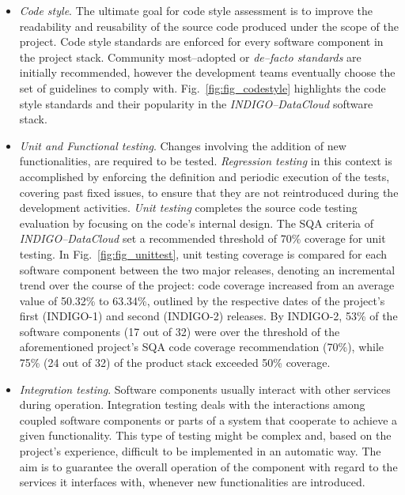 \documentclass[journal]{IEEEtran}
\begin{document}
\begin{itemize}
\item \textit{Code style}.
The ultimate goal for code style assessment is to improve the readability and reusability of the source code produced under the scope of the
project. Code style standards are enforced for every software component in the project stack. Community
most--adopted or \textit{de--facto standards} are initially recommended, however the development teams eventually
choose the set of guidelines to comply with. Fig.~\ref{fig:fig_codestyle} highlights the code style standards and
their popularity
in the {\sl INDIGO--DataCloud} software stack.

\item \textit{Unit and Functional testing}.
Changes involving the addition of new functionalities, are required to be tested. \textit{Regression
testing} in this context is accomplished by enforcing the definition and periodic execution
of the tests, covering past fixed issues, to ensure that they are not reintroduced during the development
activities. \textit{Unit testing} completes the source code testing evaluation by focusing on the code's 
internal design. The SQA criteria of {\sl INDIGO--DataCloud} set a recommended threshold of 70\% coverage 
for unit testing. In Fig.~\ref{fig:fig_unittest}, unit testing coverage is compared for each software 
component between the two major releases, denoting an incremental trend over the course of the project: 
code coverage increased from an average value of 50.32\% to 63.34\%, outlined by the respective dates of
the project's first (INDIGO-1) and second (INDIGO-2) releases. By INDIGO-2, 53\% of the software components
(17 out of 32) were over the threshold of the aforementioned project's SQA code coverage recommendation 
(70\%), while 75\% (24 out of 32) of the product stack exceeded 50\% coverage.

\item \textit{Integration testing}. Software components usually interact with other services during
operation. Integration testing deals with the interactions among coupled software components or
parts of a system that cooperate to achieve a given functionality. This type of testing might be
complex and, based on the project's experience, difficult to be implemented in an automatic way. The aim is to
guarantee the overall operation of the component with regard to the services it interfaces with,
whenever new functionalities are introduced.


\end{itemize}
\end{document}
